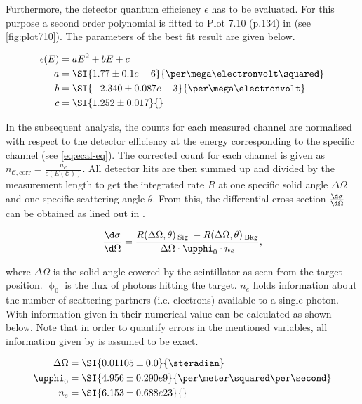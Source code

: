 Furthermore, the detector quantum efficiency $\epsilon$ has to be evaluated. For this
purpose a second order polynomial is fitted to Plot 7.10 (p.134) in \cite{Sch17} (see \autoref{fig:plot710}). The
parameters of the best fit result are given below.

\begin{align*}
\label{eq:eq:efficiency-parameters}
	\epsilon(E) &= a E^2 + b E + c \\
	a &= \SI{1.77 \pm 0.1 e-6}{\per\mega\electronvolt\squared} \\
	b &= \SI{-2.340 \pm 0.087 e-3}{\per\mega\electronvolt} \\
	c &= \SI{1.252 \pm 0.017}{}
\end{align*}

In the subsequent analysis, the counts for each measured channel are normalised with
respect to the detector efficiency at the energy corresponding to the specific
channel (see \autoref{eq:ecal-eq}). The corrected count for each channel is given as 
$n_{\mathcal{C},\text{corr}}  = \frac{n_\mathcal{C}}{\epsilon( E(\mathcal{C}) )}$. 
All detector hits are then summed up and divided by the measurement length to get the
integrated rate $R$ at one specific solid angle $\Delta\Omega$ and one specific 
scattering angle $\theta$. From this, the differential cross section 
$\frac{\d\sigma}{\d\Omega}$ can be obtained as lined out in \cite{Sch17}.

\begin{equation}
\label{eq:diff-cross-section-experimental}
	\frac{\d\sigma}{\d\Omega} = \frac{R(\Delta\Omega,\theta)\,_\text{Sig}\;-R(\Delta\Omega,\theta)\,_\text{Bkg}}{\Delta\Omega \cdot \upphi_0 \cdot n_e},
\end{equation}

where $\Delta\Omega$ is the solid angle covered by the scintillator as seen
from the target position. $\upphi_0$ is the flux of photons hitting the target. $n_e$
holds information about the number of scattering partners (i.e. electrons) available
to a single photon. With information given in \cite{Sch17} their numerical value can 
be calculated as shown below. Note that in order to quantify errors in the mentioned 
variables, all information given by \cite{Sch17} is assumed to be exact.

\begin{align*}
	\Delta\Omega &= \SI{0.01105 \pm 0.0}{\steradian} \\
	\upphi_0 &= \SI{4.956 \pm 0.290 e9}{\per\meter\squared\per\second} \\
	n_e &= \SI{6.153 \pm 0.688 e23}{} \\
\end{align*}

